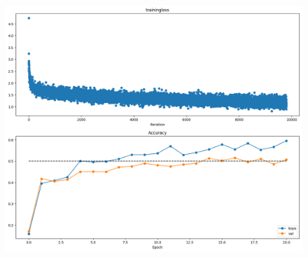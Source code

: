 \begin{itemize}[topsep=-15pt, noitemsep, nolistsep]
    \begin{figure}[!ht]
        \centering
        {{\includegraphics[scale = 0.32]{../nets/train_net/diagrams.png}}}  
    \end{figure}


\end{itemize}
